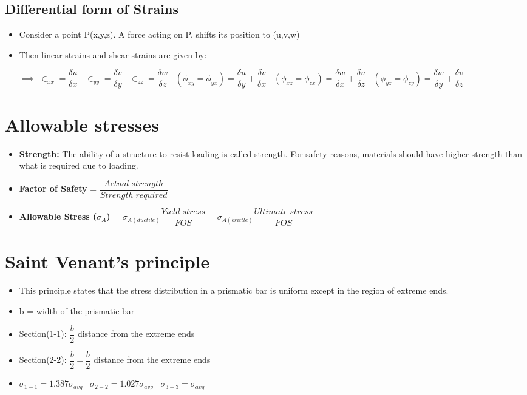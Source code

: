 \documentclass[8pt]{report}
\begin{document}
		\subsection{Differential form of Strains}
			\begin{itemize}
				\item Consider a point P(x,y,z). A force acting on P, shifts its position to (u,v,w)
				\item Then linear strains and shear strains are given by:
				\item[$\implies$] $\boxed{\in_{xx} = \dfrac{\delta u}{\delta x}}\;\;\; \boxed{\in_{yy} = \dfrac{\delta v}{\delta y}}\;\;\; \boxed{\in_{zz} = \dfrac{\delta w}{\delta z}}\;\;\; \boxed{(\phi_{xy}=\phi_{yx})=\dfrac{\delta u}{\delta y} + \dfrac{\delta v}{\delta x}}\;\;\; \boxed{(\phi_{xz}=\phi_{zx})=\dfrac{\delta w}{\delta x} + \dfrac{\delta u}{\delta z}}\;\;\; \boxed{(\phi_{yz}=\phi_{zy})=\dfrac{\delta w}{\delta y} + \dfrac{\delta v}{\delta z}}\;\;\;$
			\end{itemize}\hrulefill
	\section{Allowable stresses}
		\begin{itemize}
			\item \textbf{Strength: }The ability of a structure to resist loading is called strength. For safety reasons, materials should have higher strength than what is required due to loading. 
			\item \textbf{Factor of Safety} = $\dfrac{Actual\;strength}{Strength\;required}$
			\item \textbf{Allowable Stress ($\sigma_{A}$)} = $\boxed{\sigma_{A(ductile)}\dfrac{Yield\;stress}{FOS}} = \boxed{\sigma_{A(brittle)}\dfrac{Ultimate\;stress}{FOS}}$
		\end{itemize}\hrulefill
	\section{Saint Venant's principle}
		\begin{itemize}
			\item This principle states that the stress distribution in a prismatic bar is uniform except in the region of extreme ends.
			\item b = width of the prismatic bar
			\item Section(1-1): $\dfrac{b}{2}$ distance from the extreme ends
			\item Section(2-2): $\dfrac{b}{2} + \dfrac{b}{2}$ distance from the extreme ends
			\item $\boxed{\sigma_{1-1}=1.387\sigma_{avg}}\;\;\;\boxed{\sigma_{2-2}=1.027\sigma_{avg}}\;\;\;\boxed{\sigma_{3-3}=\sigma_{avg}}$
		\end{itemize}\hrulefill
\end{document}
